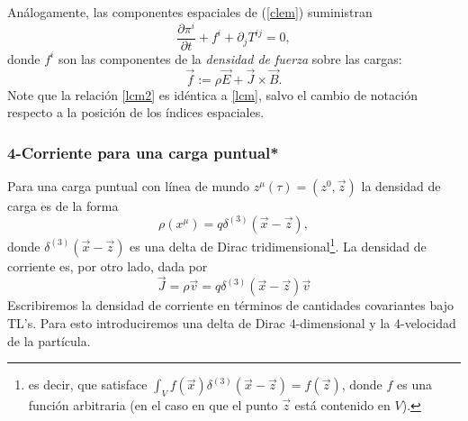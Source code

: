 Análogamente, las componentes espaciales de (\ref{clem}) suministran
\begin{equation}\label{lcm2}
\frac{\partial \pi^i}{\partial t}+f^i  +\partial_jT^{ij}=0,
\end{equation}
donde $f^i$ son las componentes de la \textit{densidad de fuerza} sobre las cargas:
\begin{equation}
\vec{f} :=\rho \vec{E}  +\vec{J}\times \vec{B}.
\end{equation}
Note que la relación \eqref{lcm2} es idéntica a \eqref{lcm}, salvo el cambio de notación respecto a la posición de los índices espaciales.




\subsubsection{4-Corriente para una carga puntual*}
Para una carga puntual con línea de mundo $z^\mu(\tau)=(z^0,\vec{z})$ la
densidad de carga es de la forma
\begin{equation}
\rho(x^\mu)=q\delta^{(3)}\left(\vec{x}-\vec{z}\right) ,
\end{equation}
donde $\delta^{(3)}\left(\vec{x}-\vec{z}\right)$ es una delta de Dirac
tridimensional\footnote{es decir, que satisface $\int_V
f(\vec{x})\delta^{(3)}\left(\vec{x}-\vec{z}\right)=f(\vec{z})$, donde $f$ es una
función arbitraria (en el caso en que el punto $\vec{z}$ está contenido en
$V$).}. La densidad de corriente es, por otro lado, dada por
\begin{equation}
\vec{J}=\rho\vec{v}=q\delta^{(3)}\left(\vec{x}-\vec{z}\right)\vec{v}
\end{equation}
Escribiremos la densidad de corriente en términos de cantidades covariantes
bajo TL's. Para esto introduciremos una delta de Dirac 4-dimensional y la
4-velocidad de la partícula.

